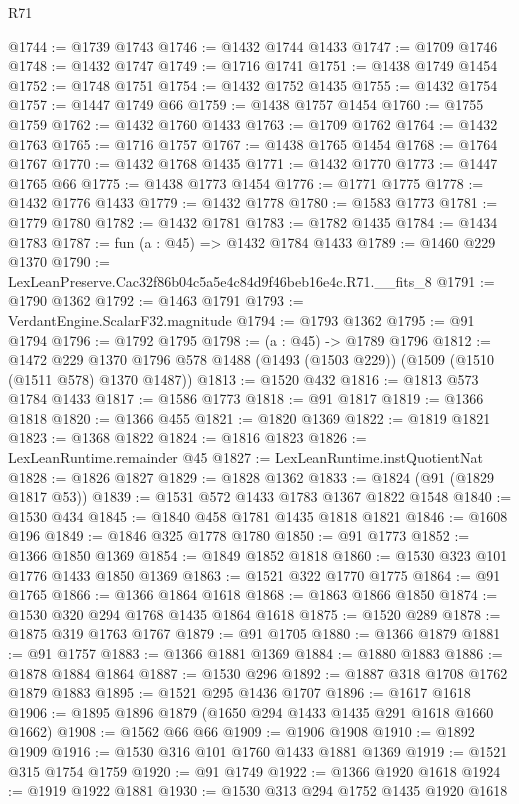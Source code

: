 \begin{lexlean}{R71}
\begin{coremodule}
@1744 := @1739 @1743
@1746 := @1432 @1744 @1433
@1747 := @1709 @1746
@1748 := @1432 @1747
@1749 := @1716 @1741
@1751 := @1438 @1749 @1454
@1752 := @1748 @1751
@1754 := @1432 @1752 @1435
@1755 := @1432 @1754
@1757 := @1447 @1749 @66
@1759 := @1438 @1757 @1454
@1760 := @1755 @1759
@1762 := @1432 @1760 @1433
@1763 := @1709 @1762
@1764 := @1432 @1763
@1765 := @1716 @1757
@1767 := @1438 @1765 @1454
@1768 := @1764 @1767
@1770 := @1432 @1768 @1435
@1771 := @1432 @1770
@1773 := @1447 @1765 @66
@1775 := @1438 @1773 @1454
@1776 := @1771 @1775
@1778 := @1432 @1776 @1433
@1779 := @1432 @1778
@1780 := @1583 @1773
@1781 := @1779 @1780
@1782 := @1432 @1781
@1783 := @1782 @1435
@1784 := @1434 @1783
@1787 := fun (a : @45) => @1432 @1784 @1433
@1789 := @1460 @229 @1370
@1790 := LexLeanPreserve.Cac32f86b04c5a5e4c84d9f46beb16e4c.R71.__fits_8
@1791 := @1790 @1362
@1792 := @1463 @1791
@1793 := VerdantEngine.ScalarF32.magnitude
@1794 := @1793 @1362
@1795 := @91 @1794
@1796 := @1792 @1795
@1798 := (a : @45) -> @1789 @1796
@1812 := @1472
    @229
    @1370
    @1796
    @578
    @1488
    (@1493 (@1503 @229))
    (@1509 (@1510 (@1511 @578) @1370 @1487))
@1813 := @1520 @432
@1816 := @1813 @573 @1784 @1433
@1817 := @1586 @1773
@1818 := @91 @1817
@1819 := @1366 @1818
@1820 := @1366 @455
@1821 := @1820 @1369
@1822 := @1819 @1821
@1823 := @1368 @1822
@1824 := @1816 @1823
@1826 := LexLeanRuntime.remainder @45
@1827 := LexLeanRuntime.instQuotientNat
@1828 := @1826 @1827
@1829 := @1828 @1362
@1833 := @1824 (@91 (@1829 @1817 @53))
@1839 := @1531 @572 @1433 @1783 @1367 @1822 @1548
@1840 := @1530 @434
@1845 := @1840 @458 @1781 @1435 @1818 @1821
@1846 := @1608 @196
@1849 := @1846 @325 @1778 @1780
@1850 := @91 @1773
@1852 := @1366 @1850 @1369
@1854 := @1849 @1852 @1818
@1860 := @1530 @323 @101 @1776 @1433 @1850 @1369
@1863 := @1521 @322 @1770 @1775
@1864 := @91 @1765
@1866 := @1366 @1864 @1618
@1868 := @1863 @1866 @1850
@1874 := @1530 @320 @294 @1768 @1435 @1864 @1618
@1875 := @1520 @289
@1878 := @1875 @319 @1763 @1767
@1879 := @91 @1705
@1880 := @1366 @1879
@1881 := @91 @1757
@1883 := @1366 @1881 @1369
@1884 := @1880 @1883
@1886 := @1878 @1884 @1864
@1887 := @1530 @296
@1892 := @1887 @318 @1708 @1762 @1879 @1883
@1895 := @1521 @295 @1436 @1707
@1896 := @1617 @1618
@1906 := @1895 @1896 @1879 (@1650 @294 @1433 @1435 @291 @1618 @1660 @1662)
@1908 := @1562 @66 @66
@1909 := @1906 @1908
@1910 := @1892 @1909
@1916 := @1530 @316 @101 @1760 @1433 @1881 @1369
@1919 := @1521 @315 @1754 @1759
@1920 := @91 @1749
@1922 := @1366 @1920 @1618
@1924 := @1919 @1922 @1881
@1930 := @1530 @313 @294 @1752 @1435 @1920 @1618

\end{coremodule}
\end{lexlean}
